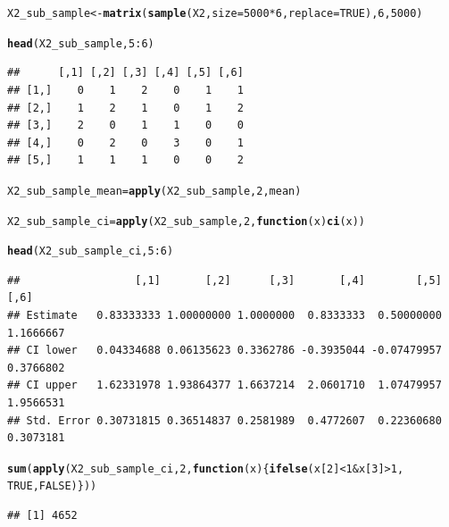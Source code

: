 \documentclass{article}\usepackage[]{graphicx}\usepackage[]{color}
\makeatletter
\newcommand{\hlnum}[1]{\textcolor[rgb]{0.686,0.059,0.569}{#1}}%
\newcommand{\hlopt}[1]{\textcolor[rgb]{0,0,0}{#1}}%
\newcommand{\hlstd}[1]{\textcolor[rgb]{0.345,0.345,0.345}{#1}}%
\newcommand{\hlkwa}[1]{\textcolor[rgb]{0.161,0.373,0.58}{\textbf{#1}}}%
\newcommand{\hlkwb}[1]{\textcolor[rgb]{0.69,0.353,0.396}{#1}}%
\newcommand{\hlkwc}[1]{\textcolor[rgb]{0.333,0.667,0.333}{#1}}%
\newcommand{\hlkwd}[1]{\textcolor[rgb]{0.737,0.353,0.396}{\textbf{#1}}}%
\newenvironment{kframe}{%
 \def\at@end@of@kframe{}%
 \ifinner\ifhmode%
  \def\at@end@of@kframe{\end{minipage}}%
  \begin{minipage}{\columnwidth}%
 \fi\fi%
 \def\FrameCommand##1{\hskip\@totalleftmargin \hskip-\fboxsep
 \colorbox{shadecolor}{##1}\hskip-\fboxsep
     \hskip-\linewidth \hskip-\@totalleftmargin \hskip\columnwidth}%
 \MakeFramed {\advance\hsize-\width
   \@totalleftmargin\z@ \linewidth\hsize
   \@setminipage}}%
 {\par\unskip\endMakeFramed%
 \at@end@of@kframe}
\newenvironment{knitrout}{}{} %
\makeatother
\begin{document}
\begin{knitrout}
\color{fgcolor}\begin{kframe}
\begin{alltt}
\hlstd{X2_sub_sample} \hlkwb{<-} \hlkwd{matrix}\hlstd{(}\hlkwd{sample}\hlstd{(X2,} \hlkwc{size} \hlstd{=} \hlnum{5000} \hlopt{*}\hlnum{6}\hlstd{,} \hlkwc{replace} \hlstd{=} \hlnum{TRUE}\hlstd{),}\hlnum{6}\hlstd{,} \hlnum{5000}\hlstd{)}

\hlkwd{head}\hlstd{(X2_sub_sample,}\hlnum{5}\hlopt{:}\hlnum{6}\hlstd{)}
\end{alltt}
\begin{verbatim}
##      [,1] [,2] [,3] [,4] [,5] [,6]
## [1,]    0    1    2    0    1    1
## [2,]    1    2    1    0    1    2
## [3,]    2    0    1    1    0    0
## [4,]    0    2    0    3    0    1
## [5,]    1    1    1    0    0    2
\end{verbatim}
\begin{alltt}
\hlstd{X2_sub_sample_mean} \hlkwb{=} \hlkwd{apply}\hlstd{(X2_sub_sample,} \hlnum{2}\hlstd{, mean)}

\hlstd{X2_sub_sample_ci} \hlkwb{=} \hlkwd{apply}\hlstd{(X2_sub_sample,} \hlnum{2}\hlstd{,} \hlkwa{function}\hlstd{(}\hlkwc{x}\hlstd{)} \hlkwd{ci}\hlstd{(x))}

\hlkwd{head}\hlstd{(X2_sub_sample_ci,}\hlnum{5}\hlopt{:}\hlnum{6}\hlstd{)}
\end{alltt}
\begin{verbatim}
##                  [,1]       [,2]      [,3]       [,4]        [,5]      [,6]
## Estimate   0.83333333 1.00000000 1.0000000  0.8333333  0.50000000 1.1666667
## CI lower   0.04334688 0.06135623 0.3362786 -0.3935044 -0.07479957 0.3766802
## CI upper   1.62331978 1.93864377 1.6637214  2.0601710  1.07479957 1.9566531
## Std. Error 0.30731815 0.36514837 0.2581989  0.4772607  0.22360680 0.3073181
\end{verbatim}
\begin{alltt}
\hlkwd{sum}\hlstd{(}\hlkwd{apply}\hlstd{(X2_sub_sample_ci,} \hlnum{2}\hlstd{,} \hlkwa{function}\hlstd{(}\hlkwc{x}\hlstd{)\{}\hlkwd{ifelse}\hlstd{(x[}\hlnum{2}\hlstd{]} \hlopt{<} \hlnum{1} \hlopt{&} \hlstd{x[}\hlnum{3}\hlstd{]} \hlopt{>} \hlnum{1}\hlstd{,}
                                                  \hlnum{TRUE}\hlstd{,} \hlnum{FALSE}\hlstd{)\}))}
\end{alltt}
\begin{verbatim}
## [1] 4652
\end{verbatim}
\end{kframe}
\end{knitrout}
\end{document}
